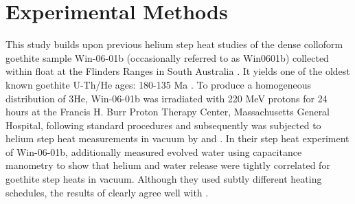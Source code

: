 \section{Experimental Methods}\label{ch2-experimental-methods}

This study builds upon previous helium step heat studies of the dense
colloform goethite sample Win-06-01b (occasionally referred to as
Win0601b) collected within float at the Flinders Ranges in South
Australia \citep{waltenberg2012,monteiro2017}. It yields one of the
oldest known goethite U-Th/He ages: 180-135 Ma \citep{waltenberg2012}.
To
produce a homogeneous distribution of 3He, Win-06-01b was irradiated
with 220 MeV protons for 24 hours at the Francis H. Burr Proton Therapy
Center, Massachusetts General Hospital, following standard procedures
\citep{shuster2004} and subsequently was subjected to helium step
heat measurements in vacuum by \citet{monteiro2017} and \citet{farley2024}.
In their step heat experiment of Win-06-01b, \citet{farley2024}
additionally measured evolved water using capacitance manometry to show
that helium and water release were tightly correlated for goethite step
heats in vacuum. Although they used subtly different heating schedules,
the results of \citet{farley2024} clearly agree well with \citet{monteiro2017}.

